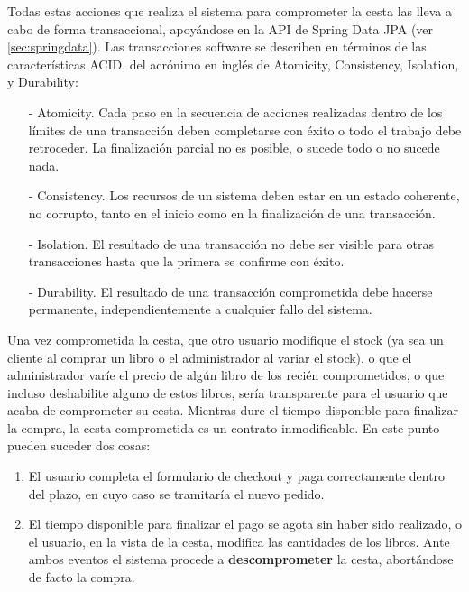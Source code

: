 \documentclass[a4paper]{article}
\begin{document}
    Todas estas acciones que realiza el sistema para comprometer la cesta las lleva a cabo de forma transaccional, apoyándose en la API de Spring Data JPA (ver \ref{sec:springdata}). Las transacciones software se describen en términos de las características ACID, del acrónimo en inglés de Atomicity, Consistency, Isolation, y Durability:
    
    \begin{itemize}
    	\item[-] Atomicity. Cada paso en la secuencia de acciones realizadas dentro de los límites de una transacción deben completarse con éxito o todo el trabajo debe
    	retroceder. La finalización parcial no es posible, o sucede todo o no sucede nada.
    	\item[-] Consistency. Los recursos de un sistema deben estar en un estado coherente, no corrupto, tanto en el inicio como en la finalización de una transacción.
    	\item[-] Isolation. El resultado de una transacción no debe ser visible para otras transacciones hasta que la primera se confirme con éxito.
    	\item[-] Durability. El resultado de una transacción comprometida debe hacerse permanente, independientemente a cualquier fallo del sistema.
    \end{itemize}
    
    Una vez comprometida la cesta, que otro usuario modifique el stock (ya sea un cliente al comprar un libro o el administrador al variar el stock), o que el administrador varíe el precio de algún libro de los recién comprometidos, o que incluso deshabilite alguno de estos libros, sería transparente para el usuario que acaba de comprometer su cesta. Mientras dure el tiempo disponible para finalizar la compra, la cesta comprometida es un contrato inmodificable. En este punto pueden suceder dos cosas: 
    
    \begin{enumerate}
    	\item El usuario completa el formulario de checkout y paga correctamente dentro del plazo, en cuyo caso se tramitaría el nuevo pedido.
    	\item El tiempo disponible para finalizar el pago se agota sin haber sido realizado, o el usuario, en la vista de la cesta, modifica las cantidades de los libros. Ante ambos eventos el sistema procede a \textbf{descomprometer} la cesta, abortándose de facto la compra.
    \end{enumerate}
    
\end{document}

